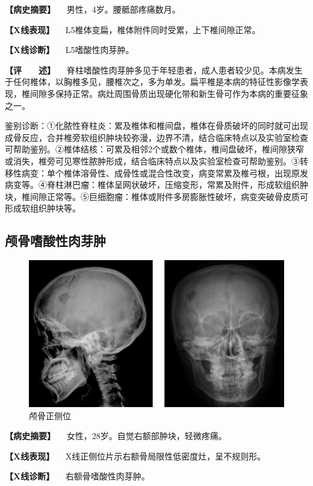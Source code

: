 \textbf{【病史摘要】} 　男性，4岁。腰骶部疼痛数月。

\textbf{【X线表现】} 　L5椎体变扁，椎体附件同时受累，上下椎间隙正常。

\textbf{【X线诊断】} 　L5嗜酸性肉芽肿。

\textbf{【评　　述】}
　脊柱嗜酸性肉芽肿多见于年轻患者，成人患者较少见。本病发生于任何椎体，以胸椎多见，腰椎次之，多为单发。扁平椎是本病的特征性影像学表现，椎间隙多保持正常。病灶周围骨质出现硬化带和新生骨可作为本病的重要征象之一。

鉴别诊断：①化脓性脊柱炎：累及椎体和椎间盘，椎体在骨质破坏的同时就可出现成骨反应，合并椎旁软组织肿块较弥漫，边界不清，结合临床特点以及实验室检查可帮助鉴别。②椎体结核：可累及相邻2个或数个椎体，椎间盘破坏，椎间隙狭窄或消失，椎旁可见寒性脓肿形成，结合临床特点以及实验室检查可帮助鉴别。③转移性病变：单个椎体溶骨性、成骨性或混合性改变，病变常累及椎弓根，出现原发病变等。④脊柱淋巴瘤：椎体呈网状破坏，压缩变形，常累及附件，形成软组织肿块，椎间隙正常等。⑤巨细胞瘤：椎体或附件多房膨胀性破坏，病变突破骨皮质可形成软组织肿块等。

\subsection{颅骨嗜酸性肉芽肿}

\begin{figure}[!htbp]
 \centering
 \includegraphics{./images/Image00113.jpg}
 \captionsetup{justification=centering}
 \caption{颅骨正侧位}
 \label{fig2-7-28}
  \end{figure} 

\textbf{【病史摘要】} 　女性，28岁。自觉右额部肿块，轻微疼痛。

\textbf{【X线表现】} 　X线正侧位片示右额骨局限性低密度灶，呈不规则形。

\textbf{【X线诊断】} 　右额骨嗜酸性肉芽肿。

